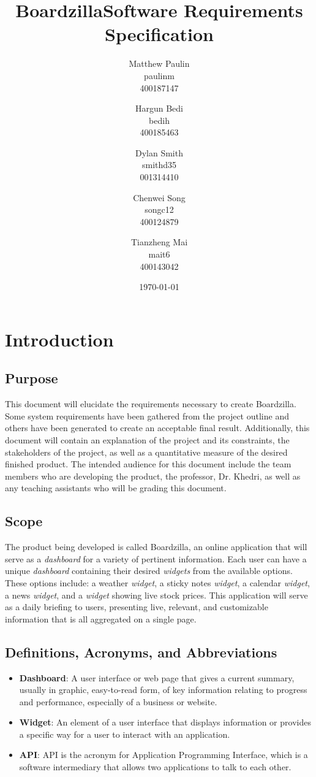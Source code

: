 \documentclass{article}
\title{\textbf{Boardzilla\break Software Requirements Specification}}
\author{Matthew Paulin \\ paulinm \\ 400187147 \and
	Hargun Bedi \\ bedih \\ 400185463 \and
	Dylan Smith \\ smithd35 \\ 001314410 \and
	Chenwei Song \\ songc12 \\ 400124879 \and
	Tianzheng Mai \\ mait6 \\ 400143042
}
\date{\today}
\begin{document}
	\maketitle	 
	\newpage
	\tableofcontents
	\newpage
	\section{Introduction}
	\label{sec:introduction}
	\subsection{Purpose}
	\label{sub:purpose}
	This document will elucidate the requirements necessary to create Boardzilla. Some system requirements have been gathered from the project outline and others have been generated to create an acceptable final result. Additionally, this document will contain an explanation of the project and its constraints, the stakeholders of the project, as well as a quantitative measure of the desired finished product. The intended audience for this document include the team members who are developing the product, the professor, Dr. Khedri, as well as any teaching assistants who will be grading this document.
	
	\subsection{Scope}
	\label{sub:scope}
	The product being developed is called Boardzilla, an online application that will serve as a \textit{dashboard} for a variety of pertinent information. Each user can have a unique \textit{dashboard} containing their desired \textit{widgets} from the available options. These options include: a weather \textit{widget}, a sticky notes \textit{widget}, a calendar \textit{widget}, a news \textit{widget}, and a \textit{widget} showing live stock prices. This application will serve as a daily briefing to users, presenting live, relevant, and customizable information that is all aggregated on a single page. 
	
	\subsection{Definitions, Acronyms, and Abbreviations}
	\label{sub:definitions_acronyms_and_abbreviations}
	\begin{itemize}
		\item \textbf{Dashboard}: A user interface or web page that gives a current summary, usually in graphic, easy-to-read form, of key information relating to progress and performance, especially of a business or website. \cite{dictionary.com}
		\item \textbf{Widget}: An element of a user interface that displays information or provides a specific way for a user to interact with an application. \cite{TechTarget}
		\item \textbf{API}: API is the acronym for Application Programming Interface, which is a software intermediary that allows two applications to talk to each other.
		\cite{Mulesoft}
	\end{itemize}
	
\end{document}
